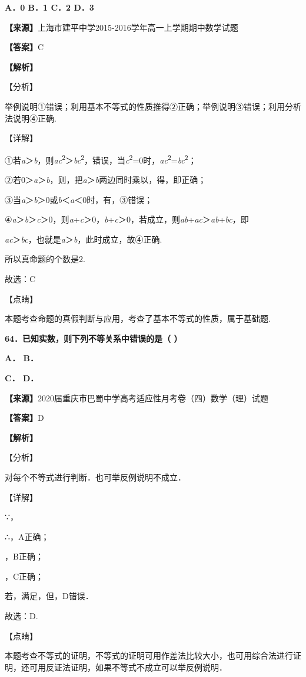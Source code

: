 \textbf{A．0 B．1 C．2 D．3}

\textbf{【来源】}上海市建平中学2015-2016学年高一上学期期中数学试题

\textbf{【答案】}C

\textbf{【解析】}

【分析】

举例说明①错误；利用基本不等式的性质推得②正确；举例说明③错误；利用分析法说明④正确.

【详解】

①若\emph{a}＞\emph{b}，则\emph{ac}\textsuperscript{2}＞\emph{bc}\textsuperscript{2}，错误，当\emph{c}\textsuperscript{2}=0时，\emph{ac}\textsuperscript{2}=\emph{bc}\textsuperscript{2}；

②若0＞\emph{a}＞\emph{b}，则，把\emph{a}＞\emph{b}两边同时乘以，得，即正确；

③当\emph{a}＞\emph{b}＞0或\emph{b}＜\emph{a}＜0时，有，③错误；

④\emph{a}＞\emph{b}＞\emph{c}＞0，则\emph{a}+\emph{c}＞0，\emph{b}+\emph{c}＞0，若成立，则\emph{ab}+\emph{ac}＞\emph{ab}+\emph{bc}，即

\emph{ac}＞\emph{bc}，也就是\emph{a}＞\emph{b}，此时成立，故④正确.

所以真命题的个数是2.

故选：C

【点睛】

本题考查命题的真假判断与应用，考查了基本不等式的性质，属于基础题.

\textbf{64．已知实数，则下列不等关系中错误的是（ ）}

\textbf{A． B．}

\textbf{C． D．}

\textbf{【来源】}2020届重庆市巴蜀中学高考适应性月考卷（四）数学（理）试题

\textbf{【答案】}D

\textbf{【解析】}

【分析】

对每个不等式进行判断．也可举反例说明不成立．

【详解】

∵，

∴，A正确；

，B正确；

，C正确；

若，满足，但，D错误．

故选：D.

【点睛】

本题考查不等式的证明，不等式的证明可用作差法比较大小，也可用综合法进行证明，还可用反证法证明，如果不等式不成立可以举反例说明．

